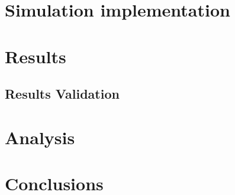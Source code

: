 \section{Simulation implementation}



\section{Results}

\subsection{Results Validation}

\section{Analysis}


\section{Conclusions}

